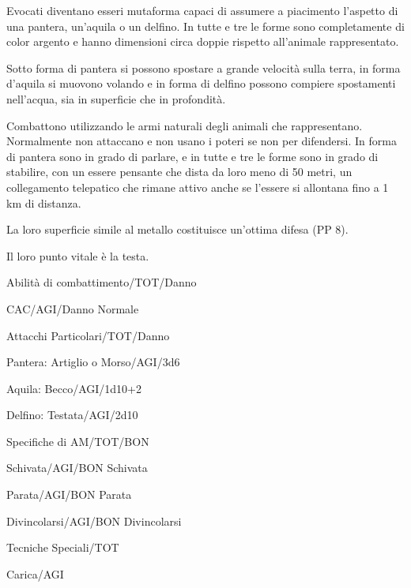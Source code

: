 Evocati diventano esseri mutaforma capaci di assumere a piacimento
l'aspetto di una pantera, un'aquila o un delfino. In tutte e tre le
forme sono completamente di color argento e hanno dimensioni circa
doppie rispetto all'animale rappresentato. 

Sotto forma di pantera si possono spostare a grande velocit\`a sulla
terra, in forma d'aquila si muovono volando e in forma di delfino
possono compiere spostamenti nell'acqua, sia in superficie che in
profondit\`a. 

Combattono utilizzando le armi naturali degli animali che
rappresentano.  Normalmente non attaccano e non usano i poteri se non
per difendersi.  In forma di pantera sono in grado di parlare, e in
tutte e tre le forme sono in grado di stabilire, con un essere
pensante che dista da loro meno di 50 metri, un collegamento
telepatico che rimane attivo anche se l'essere si allontana fino a 1
km di distanza.

La loro superficie simile al metallo costituisce un'ottima difesa (PP
8). 

Il loro punto vitale \`e la testa.


\begin{parmostro}{Abilit\`a di combattimento/TOT/Danno}
\item CAC/AGI/Danno Normale
\end{parmostro}

\begin{parmostro}{Attacchi Particolari/TOT/Danno}
\item  Pantera: Artiglio o Morso/AGI/3d6
\item Aquila: Becco/AGI/1d10+2
\item  Delfino: Testata/AGI/2d10
\end{parmostro}

\begin{parmostro}{Specifiche di AM/TOT/BON}
\item Schivata/AGI/BON Schivata
\item  Parata/AGI/BON Parata
\item  Divincolarsi/AGI/BON Divincolarsi
\end{parmostro}

\begin{parmostro}{Tecniche Speciali/TOT}
\item Carica/AGI
\end{parmostro}

